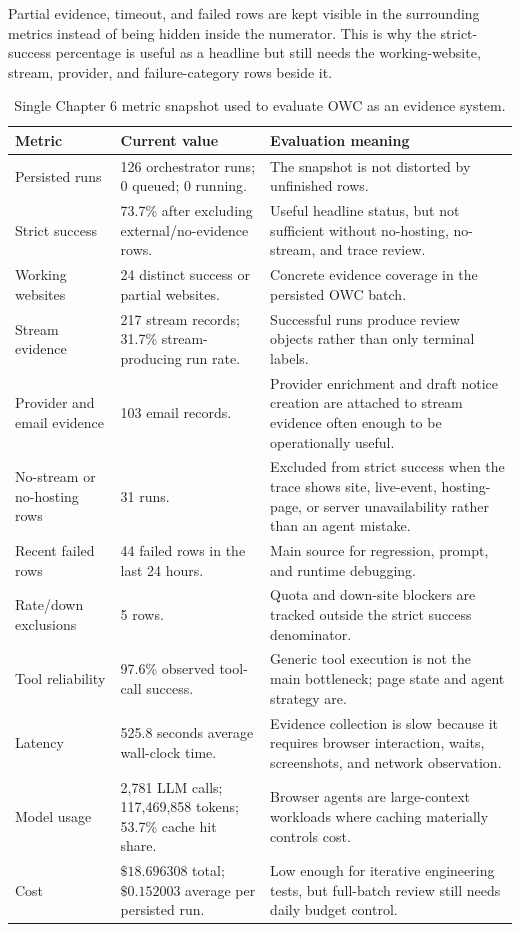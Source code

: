 

Partial evidence, timeout, and failed rows are kept visible in the surrounding metrics
instead of being hidden inside the numerator. This is why the strict-success percentage
is useful as a headline but still needs the working-website, stream, provider, and
failure-category rows beside it.

\begin{table}[!htbp]
\centering
\footnotesize
\begin{tabularx}{\textwidth}{Q{3.4cm}Y Y}
\toprule
{}
Metric & Current value & Evaluation meaning \\
\midrule
Persisted runs & 126 orchestrator runs; 0 queued; 0 running. & The snapshot is not
distorted by unfinished rows. \\
Strict success & 73.7\% after excluding external/no-evidence rows. & Useful headline
status, but not sufficient without no-hosting, no-stream, and trace review. \\
Working websites & 24 distinct success or partial websites. & Concrete evidence
coverage in the persisted OWC batch. \\
Stream evidence & 217 stream records; 31.7\% stream-producing run rate. & Successful
runs produce review objects rather than only terminal labels. \\
Provider and email evidence & 103 email records. & Provider enrichment and draft notice
creation are attached to stream evidence often enough to be operationally useful. \\
No-stream or no-hosting rows & 31 runs. & Excluded from strict success when the trace
shows site, live-event, hosting-page, or server unavailability rather than an agent
mistake. \\
Recent failed rows & 44 failed rows in the last 24 hours. & Main source for regression,
prompt, and runtime debugging. \\
Rate/down exclusions & 5 rows. & Quota and down-site blockers are tracked outside the
strict success denominator. \\
Tool reliability & 97.6\% observed tool-call success. & Generic tool execution is not
the main bottleneck; page state and agent strategy are. \\
Latency & 525.8 seconds average wall-clock time. & Evidence collection is slow because
it requires browser interaction, waits, screenshots, and network observation. \\
Model usage & 2,781 LLM calls; 117,469,858 tokens; 53.7\% cache hit share. & Browser
agents are large-context workloads where caching materially controls cost. \\
Cost & \(\$18.696308\) total; \(\$0.152003\) average per persisted run. & Low enough
for iterative engineering tests, but full-batch review still needs daily budget control. \\
\bottomrule
\end{tabularx}
\caption{Single Chapter 6 metric snapshot used to evaluate OWC as an evidence system.}
\label{tab:eval-single-metric-snapshot}
\end{table}

